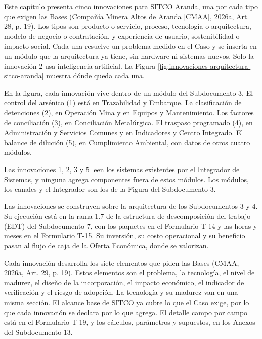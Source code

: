 \documentclass[subdoc]{../../comun/overfore}
\begin{document}
Este capítulo presenta cinco innovaciones para SITCO Aranda, una por cada tipo que exigen las Bases (Compañía Minera Altos de Aranda [CMAA], 2026a, Art. 28, p. 19). Los tipos son producto o servicio, proceso, tecnología o arquitectura, modelo de negocio o contratación, y experiencia de usuario, sostenibilidad o impacto social. Cada una resuelve un problema medido en el Caso y se inserta en un módulo que la arquitectura ya tiene, sin hardware ni sistemas nuevos. Solo la innovación 2 usa inteligencia artificial. La Figura \ref{fig:innovaciones-arquitectura-sitco-aranda} muestra dónde queda cada una.

En la figura, cada innovación vive dentro de un módulo del Subdocumento 3. El control del arsénico (1) está en Trazabilidad y Embarque. La clasificación de detenciones (2), en Operación Mina y en Equipos y Mantenimiento. Los factores de conciliación (3), en Conciliación Metalúrgica. El traspaso programado (4), en Administración y Servicios Comunes y en Indicadores y Centro Integrado. El balance de dilución (5), en Cumplimiento Ambiental, con datos de otros cuatro módulos.

Las innovaciones 1, 2, 3 y 5 leen los sistemas existentes por el Integrador de Sistemas, y ninguna agrega componentes fuera de estos módulos. Los módulos, los canales y el Integrador son los de la Figura  del Subdocumento 3.

Las innovaciones se construyen sobre la arquitectura de los Subdocumentos 3 y 4. Su ejecución está en la rama 1.7 de la estructura de descomposición del trabajo (EDT) del Subdocumento 7, con los paquetes en el Formulario T-14 y las horas y meses en el Formulario T-15. Su inversión, su costo operacional y su beneficio pasan al flujo de caja de la Oferta Económica, donde se valorizan.

Cada innovación desarrolla los siete elementos que piden las Bases (CMAA, 2026a, Art. 29, p. 19). Estos elementos son el problema, la tecnología, el nivel de madurez, el diseño de la incorporación, el impacto económico, el indicador de verificación y el riesgo de adopción. La tecnología y su madurez van en una misma sección. El alcance base de SITCO ya cubre lo que el Caso exige, por lo que cada innovación se declara por lo que agrega. El detalle campo por campo está en el Formulario T-19, y los cálculos, parámetros y supuestos, en los Anexos del Subdocumento 13.
\end{document}
